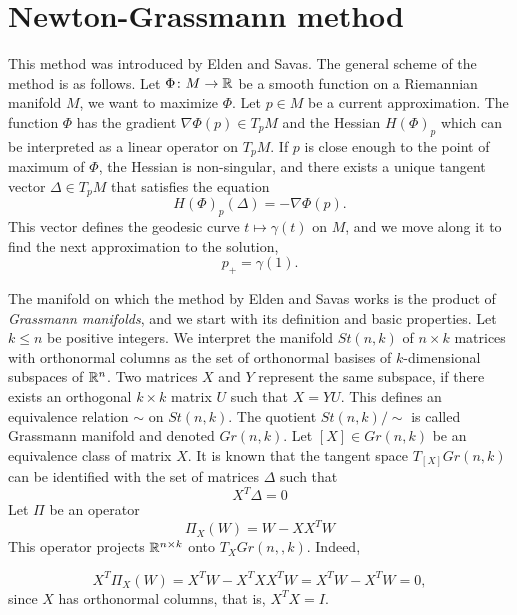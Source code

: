 \section{Newton-Grassmann method}
\label{sec_newgr}

This method was introduced by Elden and Savas. 
The general scheme of the method is as follows.
Let $\Phi \colon M \to \mathbb{R}$ be a smooth function 
on a Riemannian manifold $M$, we want to maximize $\Phi$.
Let $p \in M$
be a current approximation. The function $\Phi$ has the gradient 
$\nabla \Phi (p) \in T_pM$ and the Hessian $H(\Phi)_p$
which can be interpreted as a linear operator on $T_pM$.
If $p$ is close enough to the point of maximum of $\Phi$,
the Hessian is non-singular, and there exists a unique tangent vector 
$\Delta \in T_pM$ that satisfies the equation
\begin{equation}
    \label{NewgrGeneral}
    H(\Phi)_p(\Delta) = - \nabla \Phi(p).
\end{equation}
This vector defines the geodesic curve $t \mapsto \gamma(t)$ on $M$,
and we move along it to find the next approximation to the solution,
\begin{equation}
p_{+} = \gamma(1).
\end{equation}


The manifold on which the method by Elden and Savas works is the product
of \textit{Grassmann manifolds}, and we start with its definition and basic properties.  Let $k \leq n$ be positive integers. We interpret the manifold $St(n, k)$
of $n \times k$ matrices with orthonormal columns
as the set of orthonormal basises of $k$-dimensional subspaces
of $\mathbb{R}^n$. Two matrices $X$ and $Y$ represent the same subspace,
if there exists an orthogonal $k \times k$ matrix $U$ such that
$X = YU$. This defines an equivalence relation $\sim$ on $St(n, k)$. The quotient $St(n, k)/ \sim$ is called
Grassmann manifold and denoted $Gr(n, k)$.
Let $[X] \in Gr(n,k)$ be an equivalence class of matrix $X$.
It is known that the tangent
space $T_{[X]}Gr(n, k)$ can be identified with the set of matrices $\Delta$
such that 
\begin{equation}
    X^T \Delta = 0
\end{equation}
Let $\Pi$ be an operator
\begin{equation}
    \Pi_X(W) = W - XX^TW
\end{equation}
This operator projects $\mathbb{R}^{n \times k}$ onto $T_XGr(n, ,k)$. Indeed,

\begin{equation}
    X^T \Pi_X(W) = X^T W - X^TXX^T W = X^TW - X^TW = 0,
\end{equation}
since $X$ has orthonormal columns, that is, $X^TX = I$.



